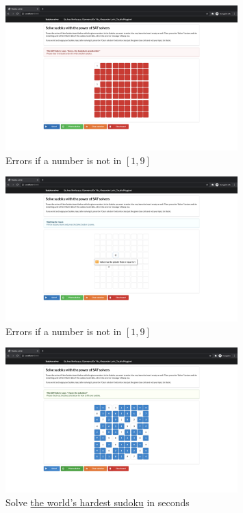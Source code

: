 \documentclass[]{usiinfprospectus}
\newcounter{col}
\begin{document}
\begin{figure}
\caption{Errors if a number is not in $ \left[ 1, 9 \right] $}
\centering
\includegraphics[width=0.8\textwidth]{pics/column_check.png}
\end{figure}

\begin{figure}
\caption{Errors if a number is not in $ \left[ 1, 9 \right] $}
\centering
\includegraphics[width=0.8\textwidth]{pics/input_check.png}
\end{figure}

\begin{figure}
\caption{Solve \href{https://www.mirror.co.uk/news/weird-news/worlds-hardest-sudoku-can-you-242294}{the world's hardest sudoku} in seconds}
\centering
\includegraphics[width=0.8\textwidth]{pics/hardest_sudoku.png}
\end{figure}



\end{document}

